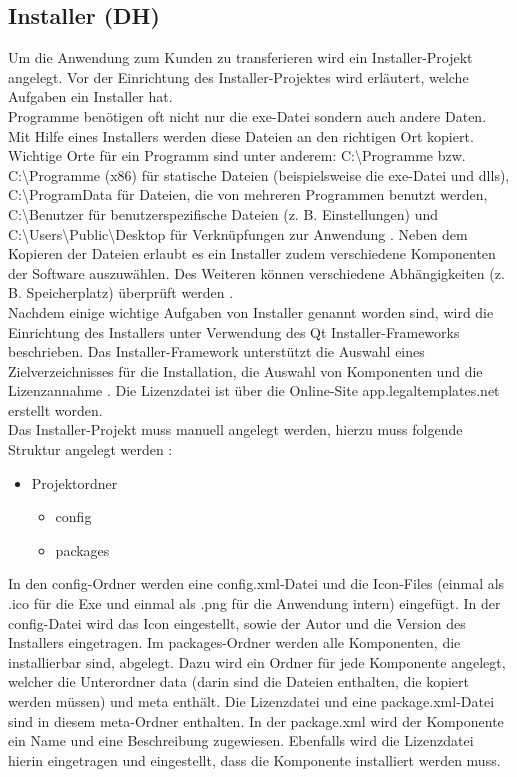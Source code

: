 \subsection{Installer (DH)}
\label{INSTALLER_HOWTO}
Um die Anwendung zum Kunden zu transferieren wird ein Installer-Projekt angelegt. Vor der Einrichtung des Installer-Projektes wird erläutert, welche Aufgaben ein Installer hat.\bigskip \\
Programme benötigen oft nicht nur die exe-Datei sondern auch andere Daten. Mit Hilfe eines Installers werden diese Dateien an den richtigen Ort kopiert. Wichtige Orte für ein Programm sind unter anderem: C:\textbackslash Programme bzw. C:\textbackslash Programme (x86) für statische Dateien (beispielsweise die exe-Datei und dlls), C:\textbackslash ProgramData für Dateien, die von mehreren Programmen benutzt werden, C:\textbackslash Benutzer für benutzerspezifische Dateien (z. B. Einstellungen) und C:\textbackslash Users\textbackslash Public\textbackslash Desktop für Verknüpfungen zur Anwendung \cite[vgl.][]{Installer_1}. Neben dem Kopieren der Dateien erlaubt es ein Installer zudem verschiedene Komponenten der Software auszuwählen. Des Weiteren können verschiedene Abhängigkeiten (z. B. Speicherplatz) überprüft werden \cite[vgl.][]{Installer_2}.\bigskip \\
Nachdem einige wichtige Aufgaben von Installer genannt worden sind, wird die Einrichtung des Installers unter Verwendung des Qt Installer-Frameworks beschrieben. Das Installer-Framework unterstützt die Auswahl eines Zielverzeichnisses für die Installation, die Auswahl von Komponenten und die Lizenzannahme \cite[vgl.][]{InstallerFramework1}. Die Lizenzdatei ist über die Online-Site app.legaltemplates.net erstellt worden.\\
Das Installer-Projekt muss manuell angelegt werden, hierzu muss folgende Struktur angelegt werden \cite[vgl][]{InstallerFramework2}:
\begin{itemize}
	\item Projektordner
	\begin{itemize}
		\item config
		\item packages
	\end{itemize}
\end{itemize}
In den config-Ordner werden eine config.xml-Datei und die Icon-Files (einmal als .ico für die Exe und einmal als .png für die Anwendung intern) eingefügt. In der config-Datei wird das Icon eingestellt, sowie der Autor und die Version des Installers eingetragen. Im packages-Ordner werden alle Komponenten, die installierbar sind, abgelegt. Dazu wird ein Ordner für jede Komponente angelegt, welcher die Unterordner data (darin sind die Dateien enthalten, die kopiert werden müssen) und meta enthält. Die Lizenzdatei und eine package.xml-Datei sind in diesem meta-Ordner enthalten. In der package.xml wird der Komponente ein Name und eine Beschreibung zugewiesen. Ebenfalls wird die Lizenzdatei hierin eingetragen und eingestellt, dass die Komponente installiert werden muss.\\
